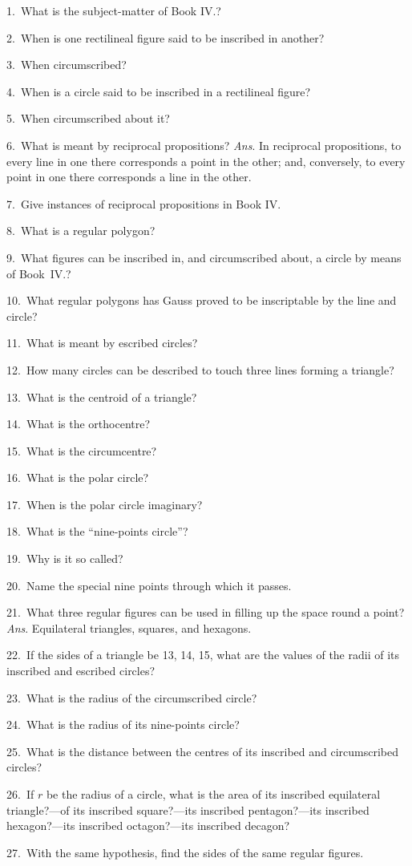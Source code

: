 \documentclass[oneside]{book}
\begin{document}
\begin{footnotesize}
1.~What is the subject-matter of Book IV\@.?

2.~When is one rectilineal figure said to be inscribed in
another?

3.~When circumscribed?

4.~When is a circle said to be inscribed in a rectilineal figure?

5.~When circumscribed about it?

6.~What is meant by reciprocal propositions? \textit{Ans}. In reciprocal
propositions, to every line in one there corresponds a point
in the other; and, conversely, to every point in one there corresponds
a line in the other.

7.~Give instances of reciprocal propositions in Book IV\@.

8.~What is a regular polygon?

9.~What figures can be inscribed in, and circumscribed about,
a circle by means of Book~IV\@.?

10.~What regular polygons has Gauss proved to be inscriptable
by the line and circle?

11.~What is meant by escribed circles?

12.~How many circles can be described to touch three lines
forming a triangle?

13.~What is the centroid of a triangle?

14.~What is the orthocentre?

15.~What is the circumcentre?

16.~What is the polar circle?

17.~When is the polar circle imaginary?

18.~What is the ``nine-points circle''?

19.~Why is it so called?

20.~Name the special nine points through which it passes.

21.~What three regular figures can be used in filling up the
space round a point? \textit{Ans}. Equilateral triangles, squares, and
hexagons.

22.~If the sides of a triangle be 13, 14, 15, what are the values
of the radii of its inscribed and escribed circles?

23.~What is the radius of the circumscribed circle?

24.~What is the radius of its nine-points circle?

25.~What is the distance between the centres of its inscribed
and circumscribed circles?

26.~If $r$ be the radius of a circle, what is the area of its
inscribed equilateral triangle?---of its inscribed square?---its
inscribed pentagon?---its inscribed hexagon?---its inscribed octagon?---its
inscribed decagon?

27.~With the same hypothesis, find the sides of the same regular
figures.
\par\end{footnotesize}
\end{document}
